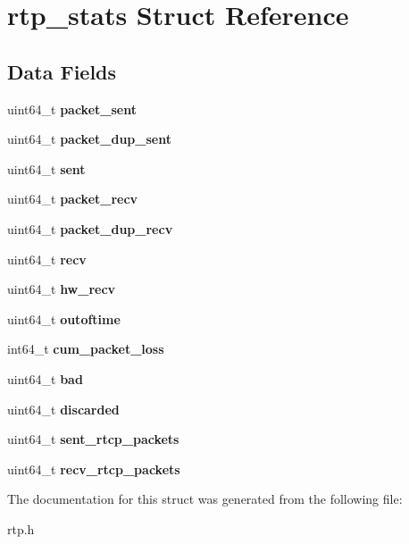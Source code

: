 \section{rtp\+\_\+stats Struct Reference}
\label{structrtp__stats}
\subsection*{Data Fields}
\begin{DoxyCompactItemize}
\item 
\mbox{\label{structrtp__stats_afe3c8b57f17dd7343469dd87fb838bb3}} 
uint64\+\_\+t {\bfseries packet\+\_\+sent}
\item 
\mbox{\label{structrtp__stats_aeb9e9a447d697169fc5beacfdac7ef01}} 
uint64\+\_\+t {\bfseries packet\+\_\+dup\+\_\+sent}
\item 
\mbox{\label{structrtp__stats_af2107b7f32b7bb2c9dee596dd5ddb493}} 
uint64\+\_\+t {\bfseries sent}
\item 
\mbox{\label{structrtp__stats_aeaf516672462c90b49b97a35c13f92cd}} 
uint64\+\_\+t {\bfseries packet\+\_\+recv}
\item 
\mbox{\label{structrtp__stats_ab52bb31c538a9cfde7d3e316a100d443}} 
uint64\+\_\+t {\bfseries packet\+\_\+dup\+\_\+recv}
\item 
\mbox{\label{structrtp__stats_ab2a2b827ee0dc7484a8cff9b477dd524}} 
uint64\+\_\+t {\bfseries recv}
\item 
\mbox{\label{structrtp__stats_a346701bc0412e658257b287bdff1a58b}} 
uint64\+\_\+t {\bfseries hw\+\_\+recv}
\item 
\mbox{\label{structrtp__stats_a663abd7ee1b579e48b889a0f80dd2f80}} 
uint64\+\_\+t {\bfseries outoftime}
\item 
\mbox{\label{structrtp__stats_a3b9f0b78e906db60c5d9594ca441c79b}} 
int64\+\_\+t {\bfseries cum\+\_\+packet\+\_\+loss}
\item 
\mbox{\label{structrtp__stats_a55f51d38ab650adb7b6e78c8ab5bbb6f}} 
uint64\+\_\+t {\bfseries bad}
\item 
\mbox{\label{structrtp__stats_ad638d626d7eccf19c874264c5f678ff6}} 
uint64\+\_\+t {\bfseries discarded}
\item 
\mbox{\label{structrtp__stats_ac247cc13609a10e55606bd8cf99fae13}} 
uint64\+\_\+t {\bfseries sent\+\_\+rtcp\+\_\+packets}
\item 
\mbox{\label{structrtp__stats_aac7fefad3886b4a77bac2f4d468de7b5}} 
uint64\+\_\+t {\bfseries recv\+\_\+rtcp\+\_\+packets}
\end{DoxyCompactItemize}


The documentation for this struct was generated from the following file\+:\begin{DoxyCompactItemize}
\item 
rtp.\+h\end{DoxyCompactItemize}
